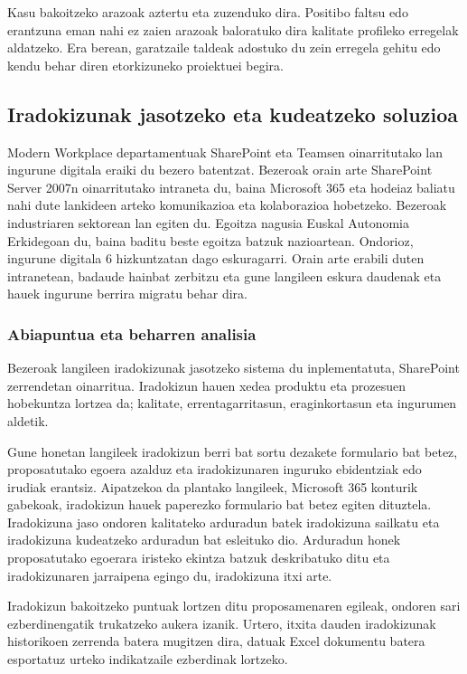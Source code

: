 Kasu bakoitzeko arazoak aztertu eta zuzenduko dira. Positibo faltsu edo erantzuna eman nahi ez zaien arazoak baloratuko dira kalitate profileko erregelak aldatzeko. Era berean, garatzaile taldeak adostuko du zein erregela gehitu edo kendu behar diren etorkizuneko proiektuei begira.

\subsection{Iradokizunak jasotzeko eta kudeatzeko soluzioa}\label{sec:iradokizunak}
Modern Workplace departamentuak SharePoint eta Teamsen oinarritutako lan ingurune digitala eraiki du bezero batentzat. Bezeroak orain arte SharePoint Server
2007n oinarritutako intraneta du, baina Microsoft 365 eta hodeiaz baliatu nahi dute lankideen arteko komunikazioa eta kolaborazioa hobetzeko. Bezeroak industriaren
sektorean lan egiten du. Egoitza nagusia Euskal Autonomia Erkidegoan du, baina baditu beste egoitza batzuk nazioartean. Ondorioz, ingurune digitala 6 hizkuntzatan
dago eskuragarri. Orain arte erabili duten intranetean, badaude hainbat zerbitzu eta gune langileen eskura daudenak eta hauek ingurune berrira migratu behar dira.

\subsubsection{Abiapuntua eta beharren analisia}
Bezeroak langileen iradokizunak jasotzeko sistema du inplementatuta, SharePoint zerrendetan oinarritua.
Iradokizun hauen xedea produktu eta prozesuen hobekuntza lortzea da; kalitate, errentagarritasun, eraginkortasun eta ingurumen aldetik. 

Gune honetan langileek iradokizun berri bat sortu dezakete formulario bat betez,
proposatutako egoera azalduz eta iradokizunaren inguruko ebidentziak edo irudiak erantsiz. Aipatzekoa da plantako langileek,
Microsoft 365 konturik gabekoak, iradokizun hauek paperezko formulario bat betez egiten dituztela. 
Iradokizuna jaso ondoren kalitateko arduradun batek iradokizuna sailkatu eta iradokizuna kudeatzeko arduradun bat esleituko dio.
Arduradun honek proposatutako egoerara iristeko ekintza batzuk deskribatuko ditu eta iradokizunaren jarraipena egingo du, iradokizuna itxi arte. 

Iradokizun bakoitzeko puntuak lortzen ditu proposamenaren egileak, ondoren sari ezberdinengatik trukatzeko aukera izanik. 
Urtero, itxita dauden iradokizunak historikoen zerrenda batera mugitzen dira, datuak Excel dokumentu batera esportatuz urteko indikatzaile ezberdinak lortzeko.

